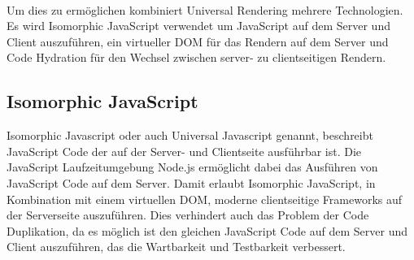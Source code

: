 \documentclass[runningheads]{llncs}
\numberwithin{figure}{section}
\begin{document}
\\
Um dies zu ermöglichen kombiniert Universal Rendering mehrere Technologien. 
Es wird Isomorphic JavaScript verwendet um JavaScript auf dem Server und Client auszuführen, 
ein virtueller DOM für das Rendern auf dem Server und 
Code Hydration für den Wechsel zwischen server- zu clientseitigen Rendern. \cite{tarkus_alabes}

\subsection{Isomorphic JavaScript}
\label{subsec:Isomorphic JavaScript}
Isomorphic Javascript oder auch Universal Javascript genannt, 
beschreibt JavaScript Code der auf der Server- und Clientseite ausführbar ist. 
Die JavaScript Laufzeitumgebung Node.js ermöglicht dabei 
das Ausführen von JavaScript Code auf dem Server. 
Damit erlaubt Isomorphic JavaScript, 
in Kombination mit einem virtuellen DOM, moderne clientseitige Frameworks auf der Serverseite auszuführen. 
Dies verhindert auch das Problem der Code Duplikation, 
da es möglich ist den gleichen JavaScript Code auf dem Server und Client auszuführen, 
das die Wartbarkeit und Testbarkeit verbessert. \cite{airbnbeng_2013}
\end{document}
